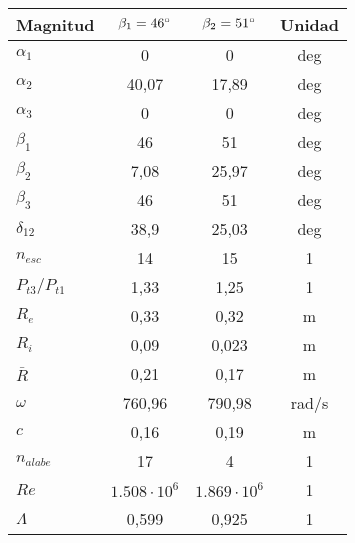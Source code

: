 \documentclass{report}
\begin{document}
\begin{center}
\begin{tabular}{l | c | c | c}
Magnitud & $\beta_1 = 46\degree$ & $\beta_2 = 51\degree$ & Unidad\\
\hline
$\alpha_1$ & 0 & 0 & deg \\
$\alpha_2$ & 40,07 & 17,89 & deg \\
$\alpha_3$ & 0 & 0 & deg \\
$\beta_1$ & 46 & 51 & deg \\
$\beta_2$ & 7,08 & 25,97 & deg \\
$\beta_3$ & 46 & 51 & deg \\
$\delta_{12}$ & 38,9 & 25,03 & deg \\
$n_{esc}$ & 14 & 15 & 1 \\
$P_{t3}/P_{t1}$ & 1,33 & 1,25 & 1 \\
$R_e$ & 0,33 & 0,32 & m \\
$R_i$ & 0,09 & 0,023 & m \\
$\bar{R}$& 0,21 & 0,17 & m \\
$\omega$ & 760,96 & 790,98 & rad/s \\
$c$ & 0,16 & 0,19 & m \\
$n_{alabe}$ & 17 & 4 & 1 \\
$Re$ & $1.508 \cdot 10^6$ & $1.869 \cdot 10^6$ & 1 \\
$\Lambda$ & 0,599 & 0,925 & 1 \\
\end{tabular}
\end{center}
\end{document}
